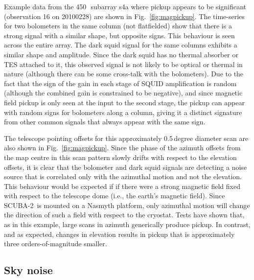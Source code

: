 \documentclass[useAMS,usenatbib,nofootinbib]{mn2e}
\newcommand{\scuba}{SCUBA-2}
\begin{document}
Example data from the 450\,\micron\ subarray s4a where pickup appears
to be significant (observation 16 on 20100228) are shown in
Fig.~\ref{fig:magpickup}. The time-series for two bolometers in the
same column (not flatfielded) show that there is a strong signal with
a similar shape, but opposite signs. This behaviour is seen across the
entire array. The dark squid signal for the same columns exhibits a
similar shape and amplitude. Since the dark squid has no thermal
absorber or TES attached to it, this observed signal is not likely to
be optical or thermal in nature (although there can be some cross-talk
with the bolometers). Due to the fact that the sign of the gain in
each stage of SQUID amplification is random (although the combined
gain is constrained to be negative), and since magnetic field pickup
is only seen at the input to the second stage, the pickup can appear
with random signs for bolometers along a column, giving it a distinct
signature from other common signals that always appear with the same
sign.

The telescope pointing offsets for this approximately 0.5\,degree
diameter scan are also shown in Fig.~\ref{fig:magpickup}. Since the
phase of the azimuth offsets from the map centre in this scan pattern
slowly drifts with respect to the elevation offsets, it is clear that
the bolometer and dark squid signals are detecting a noise source that
is correlated only with the azimuthal motion and not the
elevation. This behaviour would be expected if if there were a strong
magnetic field fixed with respect to the telescope dome (i.e., the
earth's magnetic field). Since \scuba\ is mounted on a Nasmyth
platform, only azimuthal motion will change the direction of such a
field with respect to the cryostat. Tests have shown that, as in this
example, large scans in azimuth generically produce pickup. In
contrast, and as expected, changes in elevation results in pickup that
is approximately three orders-of-magnitude smaller.

\subsection{Sky noise}
\label{sec:skynoise}
\end{document}
